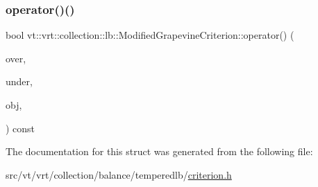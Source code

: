 \subsubsection{\texorpdfstring{operator()()}{operator()()}}
{\footnotesize\ttfamily bool vt\+::vrt\+::collection\+::lb\+::\+Modified\+Grapevine\+Criterion\+::operator() (\begin{DoxyParamCaption}\item[{\hyperlink{namespacevt_a8fb51741340b87d7aaee0bef60e9896b}{Load\+Type}}]{over,  }\item[{\hyperlink{namespacevt_a8fb51741340b87d7aaee0bef60e9896b}{Load\+Type}}]{under,  }\item[{\hyperlink{namespacevt_a8fb51741340b87d7aaee0bef60e9896b}{Load\+Type}}]{obj,  }\item[{\hyperlink{namespacevt_a8fb51741340b87d7aaee0bef60e9896b}{Load\+Type}}]{ }\end{DoxyParamCaption}) const\hspace{0.3cm}{\ttfamily [inline]}}



The documentation for this struct was generated from the following file\+:\begin{DoxyCompactItemize}
\item 
src/vt/vrt/collection/balance/temperedlb/\hyperlink{criterion_8h}{criterion.\+h}\end{DoxyCompactItemize}
